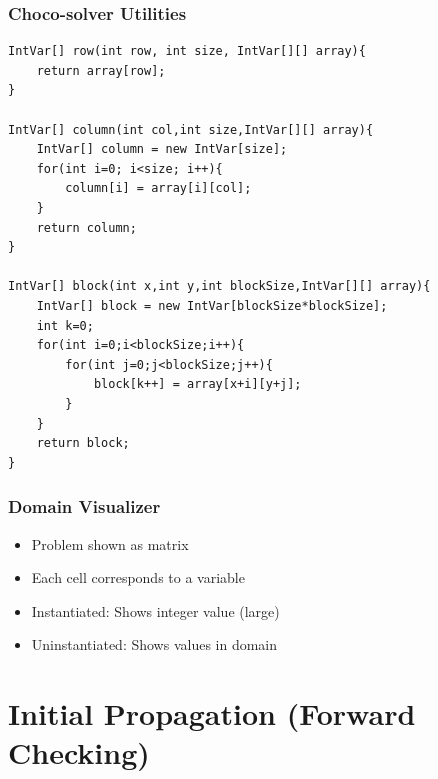 \begin{frame}[fragile]
\frametitle{Choco-solver Utilities}
\tiny
\begin{verbatim}
IntVar[] row(int row, int size, IntVar[][] array){
    return array[row];
}

IntVar[] column(int col,int size,IntVar[][] array){
    IntVar[] column = new IntVar[size];
    for(int i=0; i<size; i++){
        column[i] = array[i][col];
    }
    return column;
}

IntVar[] block(int x,int y,int blockSize,IntVar[][] array){
    IntVar[] block = new IntVar[blockSize*blockSize];
    int k=0;
    for(int i=0;i<blockSize;i++){
        for(int j=0;j<blockSize;j++){
            block[k++] = array[x+i][y+j];
        }
    }
    return block;
}
\end{verbatim}
\hyperlink{sudoku:continue}{}
\end{frame}


\begin{frame}
\frametitle{Domain Visualizer}
\label{sudoku:continue}
\begin{itemize}
\item Problem shown as matrix
\item Each cell corresponds to a variable
\item Instantiated: Shows integer value (large)
\item Uninstantiated: Shows values in domain
\end{itemize}
\end{frame}

\clearpage
\section{Initial Propagation (Forward Checking)}

